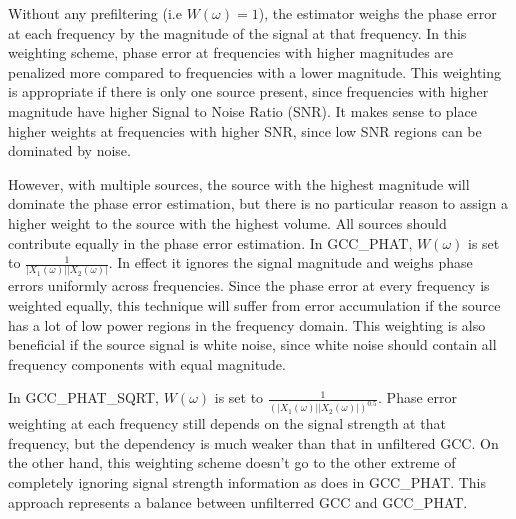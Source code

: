 Without any prefiltering (i.e $W(\omega)=1$), the estimator weighs the phase error at each frequency by the magnitude of the signal at that frequency. In this weighting scheme, phase error at frequencies with higher magnitudes are penalized more compared to frequencies with a lower magnitude. This weighting is appropriate if there is only one source present, since frequencies with higher magnitude have higher Signal to Noise Ratio (SNR). It makes sense to place higher weights at frequencies with higher SNR, since low SNR regions can be dominated by noise. 

However, with multiple sources, the source with the highest magnitude will dominate the phase error estimation, but there is no particular reason to assign a higher weight to the source with the highest volume. All sources should contribute equally in the phase error estimation. In GCC\_PHAT,  $W(\omega)$ is set to $\frac{1}{|X_1(\omega)||X_2(\omega)|}$. In effect it ignores the signal magnitude and weighs phase errors uniformly across frequencies. Since the phase error at every frequency is weighted equally, this technique will suffer from error accumulation if the source has a lot of low power regions in the frequency domain. This weighting is also beneficial if the source signal is white noise, since white noise should contain all frequency components with equal magnitude.

In GCC\_PHAT\_SQRT, $W(\omega)$ is set to $\frac{1}{(|X_1(\omega)||X_2(\omega)|)^{0.5}}$. Phase error weighting at each frequency still depends on the signal strength at that frequency, but the dependency is much weaker than that in unfiltered GCC. On the other hand, this weighting scheme doesn't go to the other extreme of completely ignoring signal strength information as does in GCC\_PHAT. This approach represents a balance between unfilterred GCC and GCC\_PHAT.



